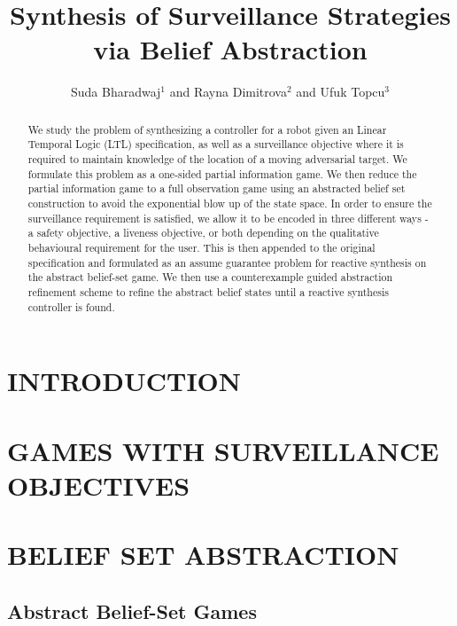 \documentclass[letterpaper, 10 pt, conference]{ieeeconf}  %
\title{\LARGE \bf Synthesis of Surveillance Strategies via Belief Abstraction}
\author{Suda Bharadwaj$^{1}$ and Rayna Dimitrova$^{2}$ and Ufuk Topcu$^{3}$%
}
\begin{document}
\maketitle
\thispagestyle{empty}
\pagestyle{empty}


\begin{abstract}
We study the problem of synthesizing a controller for a robot given an Linear Temporal Logic (LTL) specification, as well as a surveillance objective where it is required to maintain knowledge of the location of a moving adversarial target. We formulate this problem as a one-sided partial information game. We then reduce the partial information game to a full observation game using an abstracted belief set construction to avoid the exponential blow up of the state space. In order to ensure the surveillance requirement is satisfied, we allow it to be encoded in three different ways - a safety objective, a liveness objective, or both depending on the qualitative behavioural requirement for the user. This is then appended to the original specification and formulated as an assume guarantee problem for reactive synthesis on the abstract belief-set game. We then use a counterexample guided abstraction refinement scheme to refine the abstract belief states until a reactive synthesis controller is found.
\end{abstract}


\section{INTRODUCTION}




\section{GAMES WITH SURVEILLANCE OBJECTIVES}



\section{BELIEF SET ABSTRACTION}
\subsection{Abstract Belief-Set Games}

\end{document}
